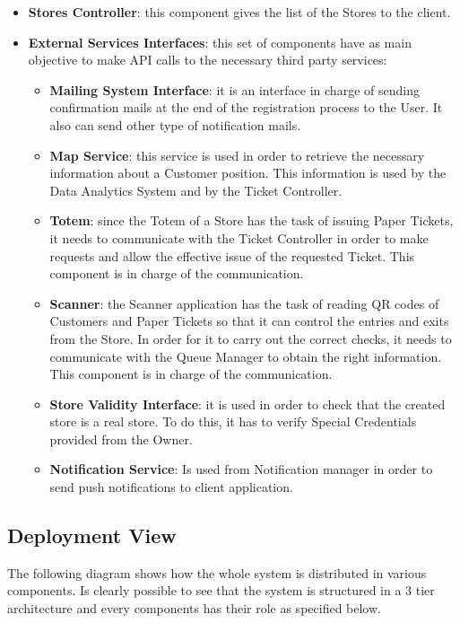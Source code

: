 \documentclass[a4paper, 12pt, oneside, table]{article}
\begin{document}
\begin{itemize}
    \item \textbf{Stores Controller}: this component gives the list of the Stores to the client.
    \item \textbf{External Services Interfaces}: this set of components have as main objective to make API calls to the necessary third party services:
    \begin{itemize}
        \item \textbf{Mailing System Interface}: it is an interface in charge of sending confirmation mails at the end of the registration process to the User. It also can send other type of notification mails.
        \item \textbf{Map Service}: this service is used in order to retrieve the necessary information about a Customer position. This information is used by the Data Analytics System and by the Ticket Controller.
        \item \textbf{Totem}: since the Totem of a Store has the task of issuing Paper Tickets, it needs to communicate with the Ticket Controller in order to make requests and allow the effective issue of the requested Ticket. This component is in charge of the communication.
        \item \textbf{Scanner}: the Scanner application has the task of reading QR codes of Customers and Paper Tickets so that it can control the entries and exits from the Store. In order for it to carry out the correct checks, it needs to communicate with the Queue Manager to obtain the right information. This component is in charge of the communication.
        \item \textbf{Store Validity Interface}: it is used in order to check that the created store is a real store. To do this, it has to verify Special Credentials provided from the Owner.
        
        \item \textbf{Notification Service}: Is used from Notification manager in order to send push notifications to client application.
    \end{itemize}
    
\end{itemize}
\subsection{Deployment View}
The following diagram shows how the whole system is distributed in various components. Is clearly possible to see that the system is structured in a 3 tier architecture and every components has their role as specified below.
\end{document}
